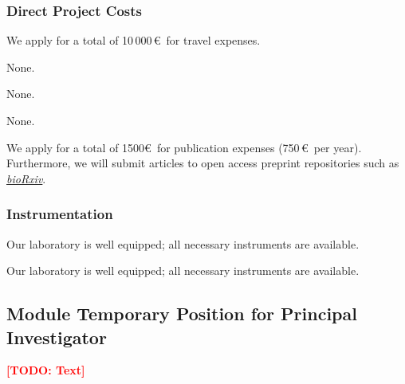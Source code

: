 \documentclass{scrartcl}
\newcommand{\todo}[1]{\xspace{\textcolor{red}{\bfseries[TODO: #1]}}\xspace}
\begin{document}
\subsubsection{Direct Project Costs}
\begin{funds}



We apply for a total of 10\,000\,\euro\ for travel expenses.

None.

None.

None.

We apply for a total of 1500\euro\ for publication expenses (750\,\euro\ per
year). Furthermore, we will submit articles to open access preprint repositories
such as \href{https://www.biorxiv.org/}{\textit{bioRxiv}}.

\end{funds}

\subsubsection{Instrumentation}

Our laboratory is well equipped; all necessary instruments are available.

Our laboratory is well equipped; all necessary instruments are available.



\vspace*{2cm}\todo{The following are additional/other modules one might want to apply for. Otherwise, just delete/comment}

\subsection{Module Temporary Position for Principal Investigator}
\todo{Text}
\end{document}
